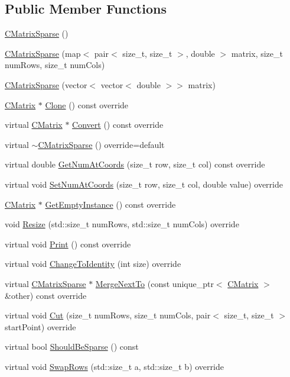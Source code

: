 \subsection*{Public Member Functions}
\begin{DoxyCompactItemize}
\item 
\hyperlink{classCMatrixSparse_a8b07f6b861304fccebc6229968a0baa0}{C\+Matrix\+Sparse} ()
\item 
\hyperlink{classCMatrixSparse_a154a1f5510bcedba74fec1eeb6ab4af6}{C\+Matrix\+Sparse} (map$<$ pair$<$ size\+\_\+t, size\+\_\+t $>$, double $>$ matrix, size\+\_\+t num\+Rows, size\+\_\+t num\+Cols)
\item 
\hyperlink{classCMatrixSparse_a2477eb8b3d46d83f067fe3c6fcb37772}{C\+Matrix\+Sparse} (vector$<$ vector$<$ double $>$$>$ matrix)
\item 
\hyperlink{classCMatrix}{C\+Matrix} $\ast$ \hyperlink{classCMatrixSparse_a8074d01357ce15ce0392a95d17fed7ef}{Clone} () const override
\item 
virtual \hyperlink{classCMatrix}{C\+Matrix} $\ast$ \hyperlink{classCMatrixSparse_a1519d4cdef830a6df4d0ec900b4413c7}{Convert} () const override
\item 
virtual \hyperlink{classCMatrixSparse_a40f32c0d13b58937ecbb279b670e9ebc}{$\sim$\+C\+Matrix\+Sparse} () override=default
\item 
virtual double \hyperlink{classCMatrixSparse_a1f071b5ed04bb2fb015f97ce7074702d}{Get\+Num\+At\+Coords} (size\+\_\+t row, size\+\_\+t col) const override
\item 
virtual void \hyperlink{classCMatrixSparse_a675982946fbb61169c625e5eb5d2d2bd}{Set\+Num\+At\+Coords} (size\+\_\+t row, size\+\_\+t col, double value) override
\item 
\hyperlink{classCMatrix}{C\+Matrix} $\ast$ \hyperlink{classCMatrixSparse_a2f545baf72ad2974e1450f8653f9bd06}{Get\+Empty\+Instance} () const override
\item 
void \hyperlink{classCMatrixSparse_a83cd4fce61394f6c2b290bf06d0efd0a}{Resize} (std\+::size\+\_\+t num\+Rows, std\+::size\+\_\+t num\+Cols) override
\item 
virtual void \hyperlink{classCMatrixSparse_acf4a7e41666e6fb29e629c3a62a7fd8f}{Print} () const override
\item 
virtual void \hyperlink{classCMatrixSparse_a38c51df51129597dd0e837a20f5c0855}{Change\+To\+Identity} (int size) override
\item 
virtual \hyperlink{classCMatrixSparse}{C\+Matrix\+Sparse} $\ast$ \hyperlink{classCMatrixSparse_a7779790e0646bf573afce21c0fc4e1b1}{Merge\+Next\+To} (const unique\+\_\+ptr$<$ \hyperlink{classCMatrix}{C\+Matrix} $>$ \&other) const override
\item 
virtual void \hyperlink{classCMatrixSparse_ac06a94f215245e118df91f16843d148b}{Cut} (size\+\_\+t num\+Rows, size\+\_\+t num\+Cols, pair$<$ size\+\_\+t, size\+\_\+t $>$ start\+Point) override
\item 
virtual bool \hyperlink{classCMatrixSparse_a780df7daf904384dadb5f3cd9bd81e40}{Should\+Be\+Sparse} () const 
\item 
virtual void \hyperlink{classCMatrixSparse_a09c9471dbb6d83f6f51f25cc24554293}{Swap\+Rows} (std\+::size\+\_\+t a, std\+::size\+\_\+t b) override
\end{DoxyCompactItemize}
